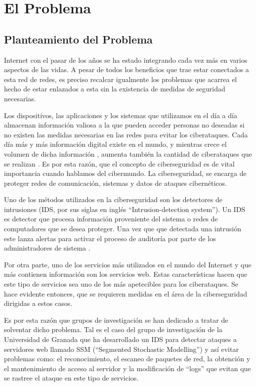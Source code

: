 \chapter{El Problema}
\label{capitulo1}

\section{Planteamiento del Problema}

Internet con el pasar de los años se ha estado integrando cada vez más en varios aspectos de las vidas. A pesar de todos los beneficios que trae estar conectados a esta red de redes, es preciso recalcar igualmente los problemas que acarrea el hecho de estar enlazados a esta sin la existencia de medidas de seguridad necesarias. 

Los dispositivos, las aplicaciones y los sistemas que utilizamos en el día a día almacenan información valiosa a la que pueden acceder personas no deseadas si no existen las medidas necesarias en las redes para evitar los ciberataques. Cada día más y más información digital existe en el mundo, y mientras crece el volumen de dicha información , aumenta también la cantidad de ciberataques que se realizan \cite{pwc}. Es por esta razón, que el concepto de ciberseguridad es de vital importancia cuando hablamos del cibermundo.  La ciberseguridad, se encarga de proteger redes de comunicación, sistemas y datos de ataques cibernéticos. 

Uno de los métodos utilizados en la ciberseguridad son los detectores de intrusiones (IDS, por sus siglas en inglés ``Intrusion-detection system''). Un IDS es detector que procesa información proveniente del sistema o redes de computadores que se desea proteger. Una vez que que detectada una intrusión este lanza alertas para activar el proceso de auditoría por parte de los administradores de sistema \cite{IDS}. 

Por otra parte, uno de los servicios más utilizados en el mundo del Internet y que más contienen información son los servicios web. Estas características hacen que este tipo de servicios sea uno de los más apetecibles para los ciberataques. Se hace evidente entonces, que se requieren medidas en el área de la ciberseguridad dirigidas a estos casos.

Es por esta razón que grupos de investigación se han dedicado a tratar de solventar dicho problema. Tal es el caso del grupo de investigación de la Universidad de Granada que  ha desarrollado un IDS para detectar ataques a servidores web llamado SSM (``Segmented Stochastic Modelling'') y así evitar problemas como: el reconocimiento, el escaneo de paquetes de red, la obtención y el mantenimiento de acceso al servidor y la modificación de ``logs'' que evitan que se rastree el ataque en este tipo de servicios.

